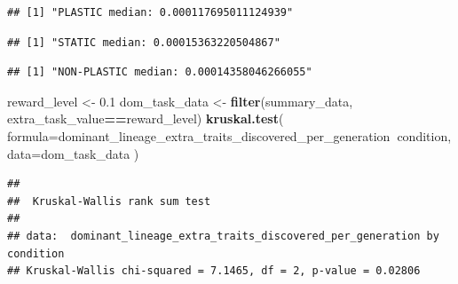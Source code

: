 \documentclass[]{book}
\newenvironment{Shaded}{\begin{snugshade}}{\end{snugshade}}
\newcommand{\DataTypeTok}[1]{\textcolor[rgb]{0.13,0.29,0.53}{#1}}
\newcommand{\FloatTok}[1]{\textcolor[rgb]{0.00,0.00,0.81}{#1}}
\newcommand{\KeywordTok}[1]{\textcolor[rgb]{0.13,0.29,0.53}{\textbf{#1}}}
\newcommand{\NormalTok}[1]{#1}
\newcommand{\OperatorTok}[1]{\textcolor[rgb]{0.81,0.36,0.00}{\textbf{#1}}}
\newcommand{\StringTok}[1]{\textcolor[rgb]{0.31,0.60,0.02}{#1}}
\begin{document}
\begin{verbatim}
## [1] "PLASTIC median: 0.000117695011124939"
\end{verbatim}

\begin{Shaded}
\end{Shaded}

\begin{verbatim}
## [1] "STATIC median: 0.00015363220504867"
\end{verbatim}

\begin{Shaded}
\end{Shaded}

\begin{verbatim}
## [1] "NON-PLASTIC median: 0.00014358046266055"
\end{verbatim}

\begin{Shaded}
\begin{Highlighting}[]
\NormalTok{reward_level <-}\StringTok{ }\FloatTok{0.1}
\NormalTok{dom_task_data <-}\StringTok{ }\KeywordTok{filter}\NormalTok{(summary_data, extra_task_value}\OperatorTok{==}\NormalTok{reward_level)}
\KeywordTok{kruskal.test}\NormalTok{(}
  \DataTypeTok{formula=}\NormalTok{dominant_lineage_extra_traits_discovered_per_generation}\OperatorTok{~}\NormalTok{condition,}
  \DataTypeTok{data=}\NormalTok{dom_task_data}
\NormalTok{)}
\end{Highlighting}
\end{Shaded}

\begin{verbatim}
## 
##  Kruskal-Wallis rank sum test
## 
## data:  dominant_lineage_extra_traits_discovered_per_generation by condition
## Kruskal-Wallis chi-squared = 7.1465, df = 2, p-value = 0.02806
\end{verbatim}
\end{document}

